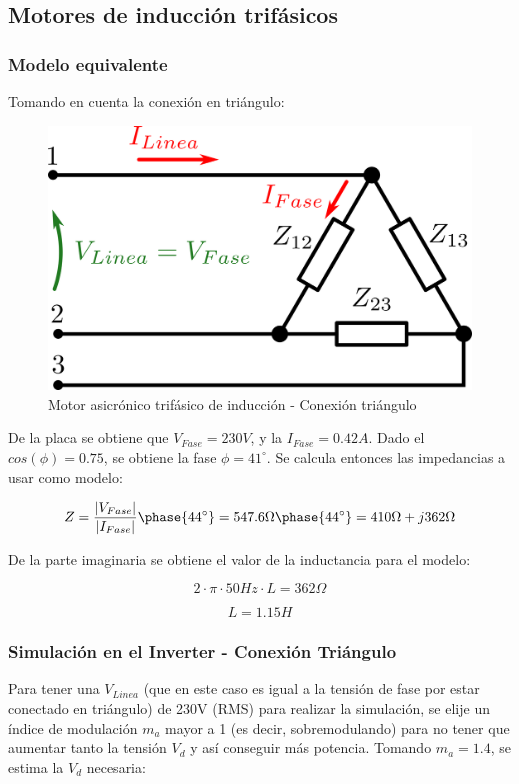 \documentclass[e4_tp3_main.tex]{subfiles}
\begin{document}
\subsection{Motores de inducción trifásicos}

\subsubsection{Modelo equivalente}

Tomando en cuenta la conexión en triángulo:

\begin{figure}[H]
\centering
\includegraphics[width=0.6\linewidth]{Imagenes/motorParte2.png}
\caption{Motor asicrónico trifásico de inducción - Conexión triángulo}
\end{figure}

De la placa se obtiene que $V_{Fase} = 230V$, y la $I_{Fase} = 0.42A$. Dado el $cos(\phi) = 0.75$, se obtiene la fase $\phi = 41^{\circ}$. Se calcula entonces las impedancias a usar como modelo:

\[
Z = \frac{|V_{Fase}|}{|I_{Fase}|} \phase{44^{\circ}} = 547.6\Omega \phase{44^{\circ}} = 410 \Omega + j362 \Omega
\]  

De la parte imaginaria se obtiene el valor de la inductancia para el modelo:

\[
2 \cdot \pi \cdot 50Hz \cdot L = 362\Omega
\]

\[
L = 1.15H
\]

\subsubsection{Simulación en el Inverter - Conexión Triángulo}

Para tener una $V_{Linea}$ (que en este caso es igual a la tensión de fase por estar conectado en triángulo) de 230V (RMS) para realizar la simulación, se elije un índice de modulación $m_a$ mayor a 1 (es decir, sobremodulando) para no tener que aumentar tanto la tensión $V_d$ y así conseguir más potencia. Tomando $m_a = 1.4$, se estima la $V_d$ necesaria:
\end{document}
